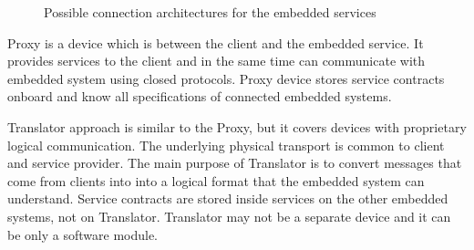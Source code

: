 \begin{figure}[H]
        \centering		  
		  
		       
        \caption{Possible connection architectures for the embedded services}
        \label{fig:connection_architectures}
\end{figure}




Proxy is a device which is between the client and the embedded service. It
provides services to the client and in the same time can communicate with
embedded system using closed protocols. Proxy device stores service contracts
onboard and know all specifications of connected embedded systems. 

Translator approach is similar to the Proxy, but it covers devices with proprietary
logical communication. The underlying physical transport is common to client and
service provider. The main purpose of Translator is to convert messages that
come from clients into into a logical format that the embedded system
can understand. Service contracts are stored inside services on the other
embedded systems, not on Translator. Translator may not be a separate device and
it can be only a software module.

